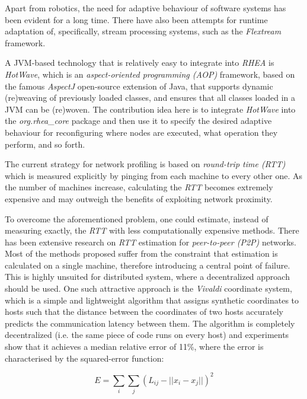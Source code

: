 \documentclass{dithesis}
\begin{document}
Apart from robotics, the need for adaptive behaviour of software systems has been evident for a long time\cite{reconf_survey}. There have also been attempts for runtime adaptation of, specifically, stream processing systems, such as the \textit{Flextream} framework\cite{flextream}. 

A JVM-based technology that is relatively easy to integrate into \textit{RHEA} is \textit{HotWave}\cite{reconf_java}, which is an \textit{aspect-oriented programming (AOP)} framework, based on the famous \textit{AspectJ} open-source extension of Java, that supports dynamic (re)weaving of previously loaded classes, and ensures that all classes loaded in a JVM can be (re)woven. The contribution idea here is to integrate \textit{HotWave} into the \textit{org.rhea\_core} package and then use it to specify the desired adaptive behaviour for reconfiguring where nodes are executed, what operation they perform, and so forth.


The current strategy for network profiling is based on \textit{round-trip time (RTT)} which is measured explicitly by pinging from each machine to every other one. As the number of machines increase, calculating the \textit{RTT} becomes extremely expensive and may outweigh the benefits of exploiting network proximity. 

To overcome the aforementioned problem, one could estimate, instead of measuring exactly, the \textit{RTT} with less computationally expensive methods. There has been extensive research on \textit{RTT} estimation for \textit{peer-to-peer (P2P)} networks\cite{rtt_survey}. Most of the methods proposed suffer from the constraint that estimation is calculated on a single machine, therefore introducing a central point of failure. This is highly unsuited for distributed system, where a decentralized approach should be used. One such attractive approach is the \textit{Vivaldi} coordinate system\cite{vivaldi}, which is a simple and lightweight algorithm that assigns synthetic coordinates to hosts such that the distance between the coordinates of two hosts accurately predicts the communication latency between them. The algorithm is completely decentralized (i.e. the same piece of code runs on every host) and experiments show that it achieves a median relative error of 11\%, where the error is characterised by the squared-error function:

\[ E =  \sum_i \sum_j (L_{ij}-||x_i - x_j||)^2  \]
\end{document}
